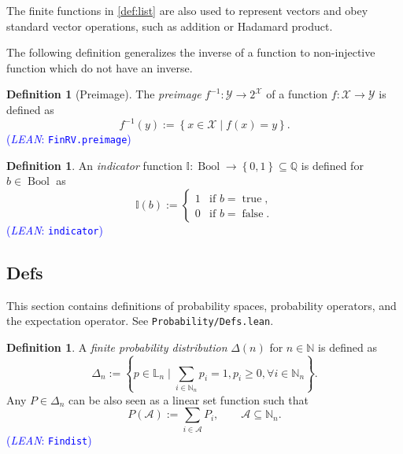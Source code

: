 \documentclass[letterpaper]{article}
\theoremstyle{plain}
\theoremstyle{definition}
\newtheorem{definition}[theorem]{Definition}
\theoremstyle{remark}
\newcommand{\Nats}{\mathbb{N}}
\DeclareMathOperator{\bool}{Bool}
\newcommand{\I}{\mathbb{I}}
\newcommand{\lean}[1]{\textcolor{blue}{(\emph{LEAN}: \texttt{#1})}}
\newcommand{\leanok}{}
\begin{document}
The finite functions in \cref{def:list} are also used to represent vectors and obey standard vector operations, such as addition or Hadamard product.

The following definition generalizes the inverse of a function to non-injective function which do not have an inverse. 
\begin{definition}[Preimage]
The \emph{preimage} $f^{-1}\colon \mathcal{Y} \to 2^{\mathcal{X}}$ of a function $f\colon \mathcal{X} \to \mathcal{Y}$ is defined as
\begin{equation} \label{eq:preimage-set}
f^{-1}(y) := \left\{ x \in \mathcal{X} \mid  f(x) = y \right\} .
\end{equation}
\lean{FinRV.preimage} \leanok
\end{definition}

\begin{definition} \label{def:indicator}
An \emph{indicator} function $\I \colon \bool \to \left\{ 0, 1 \right\} \subseteq \mathbb{Q}$ is defined for $b\in \bool$ as
\[
\I(b) :=
\begin{cases}
1 &\text{if } b = \operatorname{true}, \\
0 &\text{if } b = \operatorname{false}.
\end{cases}
\]
\lean{indicator} \leanok
\end{definition}

\subsection{Defs}

This section contains definitions of probability spaces, probability operators, and the expectation operator. See \texttt{Probability/Defs.lean}.
\begin{definition}
A \emph{finite probability distribution} $\Delta(n)$ for $n\in \Nats$ is defined as
\[
\Delta_n := \left\{ p \in \mathbb{L}_n \mid  \sum_{i \in \Nats_n} p_i = 1, p_i \ge 0, \forall i \in \Nats_n \right\}.
\]
Any $P \in  \Delta_n$ can be also seen as a linear set function such that
\[
 P(\mathcal{A}) := \sum_{i\in \mathcal{A}} P_i, \qquad \mathcal{A} \subseteq \Nats_n.  
\]
\lean{Findist} 
\end{definition}
\end{document}
